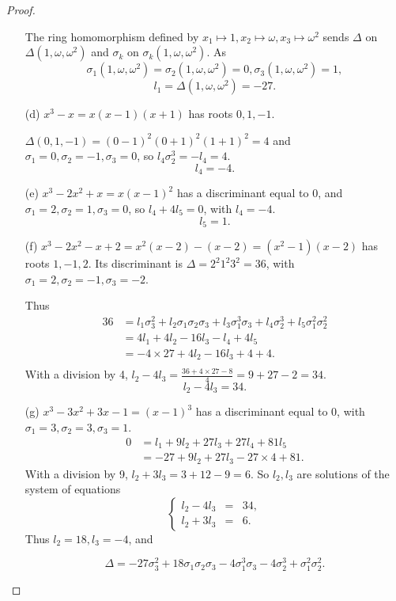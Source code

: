 \documentclass[11pt,a4paper]{article}
\begin{document}
\begin{proof}
\begin{enumerate}
The ring homomorphism defined by $x_1 \mapsto 1, x_2 \mapsto \omega, x_3 \mapsto \omega^2$ sends $\Delta$ on $\Delta(1,\omega,\omega^2)$ and $\sigma_k$ on $\sigma_k(1,\omega,\omega^2)$. As $$\sigma_1(1,\omega,\omega^2) = \sigma_2(1,\omega,\omega^2) = 0,\sigma_3(1,\omega,\omega^2)=1,$$
$$l_1 = \Delta(1,\omega,\omega^2)  = -27.$$


\item[(d)] 
$x^3-x = x(x-1)(x+1)$ has roots $0,1,-1$.

$\Delta(0,1,-1) = (0-1)^2(0+1)^2(1+1)^2 = 4$ and $\sigma_1=0,\sigma_2=-1,\sigma_3=0$, so
$l_4 \sigma_2^3 = -l_4 = 4$.
$$l_4 = -4.$$


\item[(e)] 
$x^3-2x^2+x = x(x-1)^2$ has a discriminant equal to 0, and $\sigma_1 = 2,\sigma_2=1,\sigma_3=0$, so
$l_4+4l_5=0$, with $l_4=-4$.
$$l_5=1.$$


\item[(f)]
$x^3-2x^2-x+2 = x^2(x-2) - (x-2) = (x^2-1)(x-2)$ has roots $1,-1,2$. Its discriminant is 
$\Delta = 2^2 1^2 3^2 = 36$, with $\sigma_1=2,\sigma_2=-1,\sigma_3=-2$.

Thus
\begin{align*}
36 &= l_1\sigma_3^2+l_2\sigma_1\sigma_2\sigma_3+l_3\sigma_1^3\sigma_3+l_4\sigma_2^3+l_5\sigma_1^2\sigma_2^2\\
&= 4l_1+4l_2-16l_3-l_4+4l_5\\
&=-4\times 27 +4 l_2-16l_3+4+4.\\
\end{align*}
With a division by 4,
$ l_2-4l_3 = \frac{36+ 4\times 27 - 8}{4} = 9 + 27 - 2 = 34.$
$$l_2 - 4 l_3 = 34.$$


\item[(g)]
$x^3-3x^2+3x-1 = (x-1)^3$ has a discriminant equal to 0, with $\sigma_1 = 3,\sigma_2=3,\sigma_3=1$.
\begin{align*}
0&=l_1+9l_2+27l_3+27l_4+81l_5\\
&=-27+9l_2+27l_3-27\times4+81.
\end{align*}
With a division by 9,
$l_2+3l_3 = 3+12-9=6$. So $l_2,l_3$ are solutions of the system of equations
$$\left\{
\begin{array}{ccc}
l_2-4l_3  &  = & 34,  \\
 l_2+3l_3 & =   &  6. 
\end{array}
\right.
$$
Thus $l_2 = 18,l_3=-4$, and

$$\Delta = -27\sigma_3^2+18\sigma_1\sigma_2\sigma_3-4\sigma_1^3\sigma_3-4\sigma_2^3+\sigma_1^2\sigma_2^2.$$

\end{enumerate}
\end{proof}
\end{document}
